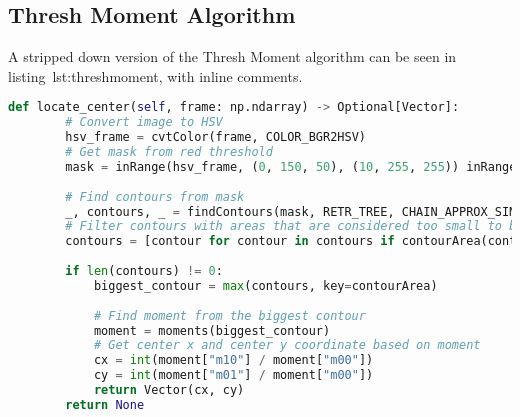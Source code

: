 \subsection{Thresh Moment Algorithm}\label{solution:thresh_moment}

A stripped down version of the Thresh Moment algorithm can be seen in listing~{lst:threshmoment}, with inline comments.

\begin{lstlisting}[language=Python,label={lst:threshmoment},caption={Stripped down version of thresh moment from thresh\_moment.py}]
	def locate_center(self, frame: np.ndarray) -> Optional[Vector]:
	    # Convert image to HSV
	    hsv_frame = cvtColor(frame, COLOR_BGR2HSV)
	    # Get mask from red threshold
	    mask = inRange(hsv_frame, (0, 150, 50), (10, 255, 255)) inRange(hsv_frame, (170, 150, 50), (180, 255, 255))
	    
	    # Find contours from mask
	    _, contours, _ = findContours(mask, RETR_TREE, CHAIN_APPROX_SIMPLE)
	    # Filter contours with areas that are considered too small to be the target
	    contours = [contour for contour in contours if contourArea(contour) > 20]
	    
	    if len(contours) != 0:
		    biggest_contour = max(contours, key=contourArea)
		    
		    # Find moment from the biggest contour
		    moment = moments(biggest_contour)
		    # Get center x and center y coordinate based on moment
		    cx = int(moment["m10"] / moment["m00"])
		    cy = int(moment["m01"] / moment["m00"])
		    return Vector(cx, cy)
	    return None
\end{lstlisting}